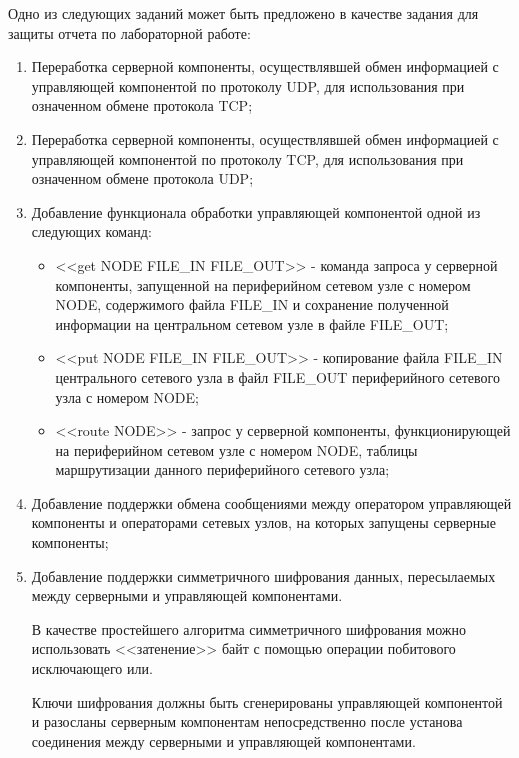 
Одно из следующих заданий может быть предложено в качестве задания для защиты отчета по лабораторной работе:

\begin{enumerate}

	\item Переработка серверной компоненты, осуществлявшей обмен информацией с управляющей компонентой по протоколу
	UDP, для использования при означенном обмене протокола TCP;

	\item Переработка серверной компоненты, осуществлявшей обмен информацией с управляющей компонентой по протоколу
	TCP, для использования при означенном обмене протокола UDP;

	\item Добавление функционала обработки управляющей компонентой одной из следующих команд:

		\begin{itemize}

			\item <<get NODE FILE\_IN FILE\_OUT>> - команда запроса у серверной компоненты, запущенной на периферийном
			сетевом узле с номером NODE, содержимого файла FILE\_IN и сохранение полученной информации на центральном
			сетевом узле в файле FILE\_OUT;

			\item <<put NODE FILE\_IN FILE\_OUT>> - копирование файла FILE\_IN центрального сетевого узла в файл FILE\_OUT
			периферийного сетевого узла с номером NODE;

			\item <<route NODE>> - запрос у серверной компоненты, функционирующей на периферийном сетевом узле с номером
			NODE, таблицы маршрутизации данного периферийного сетевого узла;

		\end{itemize}

	\item Добавление поддержки обмена сообщениями между оператором управляющей компоненты и операторами сетевых узлов,
	на которых запущены серверные компоненты;

	\item Добавление поддержки симметричного шифрования данных, пересылаемых между серверными и управляющей компонентами.

		В качестве простейшего алгоритма симметричного шифрования можно использовать <<затенение>> байт с помощью
		операции побитового исключающего или.

		Ключи шифрования должны быть сгенерированы управляющей компонентой и разосланы серверным компонентам
		непосредственно после установа соединения между серверными и управляющей компонентами.

\end{enumerate}

